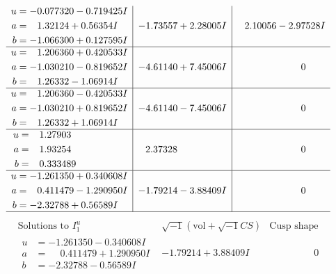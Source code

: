 \documentclass[1p]{elsarticle_modified}
\theoremstyle{definition}
\newcommand{\I}{\sqrt{-1}}
\begin{document}
$$\begin{array}{c|c|c}
\begin{aligned}
u &= -0.077320 - 0.719425 I \\
a &= \phantom{-}1.32124 + 0.56354 I \\
b &= -1.066300 + 0.127595 I\end{aligned}
 & -1.73557 + 2.28005 I & \phantom{-}2.10056 - 2.97528 I \\ \hline\begin{aligned}
u &= \phantom{-}1.206360 + 0.420533 I \\
a &= -1.030210 - 0.819652 I \\
b &= \phantom{-}1.26332 - 1.06914 I\end{aligned}
 & -4.61140 + 7.45006 I & \phantom{-0.000000 } 0 \\ \hline\begin{aligned}
u &= \phantom{-}1.206360 - 0.420533 I \\
a &= -1.030210 + 0.819652 I \\
b &= \phantom{-}1.26332 + 1.06914 I\end{aligned}
 & -4.61140 - 7.45006 I & \phantom{-0.000000 } 0 \\ \hline\begin{aligned}
u &= \phantom{-}1.27903\phantom{ +0.000000I} \\
a &= \phantom{-}1.93254\phantom{ +0.000000I} \\
b &= \phantom{-}0.333489\phantom{ +0.000000I}\end{aligned}
 & \phantom{-}2.37328\phantom{ +0.000000I} & \phantom{-0.000000 } 0 \\ \hline\begin{aligned}
u &= -1.261350 + 0.340608 I \\
a &= \phantom{-}0.411479 - 1.290950 I \\
b &= -2.32788 + 0.56589 I\end{aligned}
 & -1.79214 - 3.88409 I & \phantom{-0.000000 } 0\\
 \hline 
 \end{array}$$\newpage$$\begin{array}{c|c|c}  
\text{Solutions to }I^u_{1}& \I (\text{vol} + \sqrt{-1}CS) & \text{Cusp shape}\\
 \hline 
\begin{aligned}
u &= -1.261350 - 0.340608 I \\
a &= \phantom{-}0.411479 + 1.290950 I \\
b &= -2.32788 - 0.56589 I\end{aligned}
 & -1.79214 + 3.88409 I & \phantom{-0.000000 } 0 \\ \hline\begin{aligned}

\end{aligned}
\end{array}$$
\end{document}
